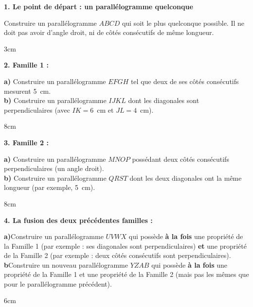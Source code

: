 \documentclass[a4paper]{book}
\begin{document}
\setcounter{chapter}{11}
\renewcommand{\monTitre}{Les parallélogrammes}

\enteteActivite{4}{\monTitre}{\thechapter}

    \vspace{0.5cm}
    
    \textbf{\Large 1. Le point de départ : un parallélogramme quelconque}
    
    Construire un parallélogramme $ABCD$ qui soit le plus \og quelconque \fg{} possible. Il ne doit pas avoir d'angle droit, ni de côtés consécutifs de même longueur.
    \begin{ZoneReponse}{3cm}
    \end{ZoneReponse}
    
    \vspace{0.5cm}
    
    \noindent
    \begin{minipage}[t]{0.48\textwidth}
        \textbf{\Large 2. Famille 1 : \points[5]}
        
        \smallskip
        \textbf{a)} Construire un parallélogramme $EFGH$ tel que deux de ses côtés consécutifs mesurent 5~cm.\\
        \textbf{b)} Construire un parallélogramme $IJKL$ dont les diagonales sont perpendiculaires (avec $IK = 6$~cm et $JL = 4$~cm).
        \begin{ZoneReponse}{8cm}
        \end{ZoneReponse}

    \end{minipage}
    \hfill
    \begin{minipage}[t]{0.48\textwidth}
        \textbf{\Large 3. Famille 2 : \points[5]}
        
        \smallskip
        \textbf{a)} Construire un parallélogramme $MNOP$ possédant deux côtés consécutifs perpendiculaires (un angle droit).\\
        \textbf{b)} Construire un parallélogramme $QRST$ dont les deux diagonales ont la même longueur (par exemple, 5~cm).
        
        \begin{ZoneReponse}{8cm}
        \end{ZoneReponse}
        
    \end{minipage}
    
    \vspace{0.5cm}
    
    \textbf{\Large 4. La fusion des deux précédentes familles : \points[5]}
    
    \textbf{a)}Construire un parallélogramme $UVWX$ qui possède \textbf{à la fois} une propriété de la Famille 1 (par exemple : ses diagonales sont perpendiculaires) \textbf{et} une propriété de la Famille 2 (par exemple : deux côtés consécutifs sont perpendiculaires). \\
    \textbf{b}Construire un nouveau parallélogramme $YZAB$ qui possède \textbf{à la fois} une propriété de la Famille 1 et une propriété de la Famille 2 (mais pas les mêmes que pour le parallélogramme précédent).
    \begin{ZoneReponse}{6cm}
    \end{ZoneReponse}
    
\end{document}
